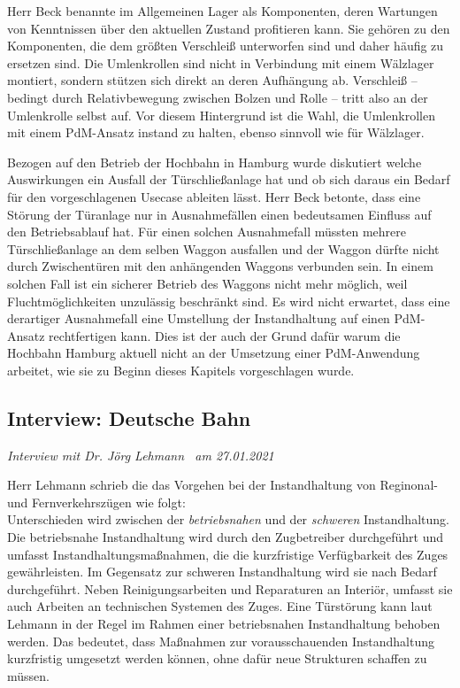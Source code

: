 Herr Beck benannte im Allgemeinen Lager als Komponenten, deren Wartungen von Kenntnissen über den aktuellen Zustand profitieren kann. Sie gehören zu den Komponenten, die dem größten Verschleiß unterworfen sind und daher häufig zu ersetzen sind. Die Umlenkrollen sind nicht in Verbindung mit einem Wälzlager montiert, sondern stützen sich direkt an deren Aufhängung ab. Verschleiß -- bedingt durch Relativbewegung zwischen Bolzen und Rolle -- tritt also an der Umlenkrolle selbst auf. Vor diesem Hintergrund ist die Wahl, die Umlenkrollen mit einem PdM-Ansatz instand zu halten, ebenso sinnvoll wie für Wälzlager.

Bezogen auf den Betrieb der Hochbahn in Hamburg wurde diskutiert welche Auswirkungen ein Ausfall der Türschließanlage hat und ob sich daraus ein Bedarf für den vorgeschlagenen Usecase ableiten lässt. Herr Beck betonte, dass eine Störung der Türanlage nur in Ausnahmefällen einen bedeutsamen Einfluss auf den Betriebsablauf hat. Für einen solchen Ausnahmefall müssten mehrere Türschließanlage an dem selben Waggon ausfallen und der Waggon dürfte nicht durch Zwischentüren mit den anhängenden Waggons verbunden sein. In einem solchen Fall ist ein sicherer Betrieb des Waggons nicht mehr möglich, weil Fluchtmöglichkeiten unzulässig beschränkt sind. Es wird nicht erwartet, dass eine derartiger Ausnahmefall eine Umstellung der Instandhaltung auf einen PdM-Ansatz rechtfertigen kann. Dies ist der auch der Grund dafür warum die Hochbahn Hamburg aktuell nicht an der Umsetzung einer PdM-Anwendung arbeitet, wie sie zu Beginn dieses Kapitels vorgeschlagen wurde.
\subsection{Interview: Deutsche Bahn}
\label{subsec:interview_deutsche_bahn}
\textit{Interview mit Dr. Jörg Lehmann~\cite{db.2021} am {27.01.2021}}

Herr Lehmann schrieb die das Vorgehen bei der Instandhaltung von Reginonal- und Fernverkehrszügen wie folgt:\\
Unterschieden wird zwischen der \textit{betriebsnahen} und der \textit{schweren} Instandhaltung. Die betriebsnahe Instandhaltung wird durch den Zugbetreiber durchgeführt und umfasst Instandhaltungsmaßnahmen, die die kurzfristige Verfügbarkeit des Zuges gewährleisten. Im Gegensatz zur schweren Instandhaltung wird sie nach Bedarf durchgeführt. Neben Reinigungsarbeiten und Reparaturen an Interiör, umfasst sie auch Arbeiten an technischen Systemen des Zuges. Eine Türstörung kann laut Lehmann in der Regel im Rahmen einer betriebsnahen Instandhaltung behoben werden. Das bedeutet, dass Maßnahmen zur vorausschauenden Instandhaltung kurzfristig umgesetzt werden können, ohne dafür neue Strukturen schaffen zu müssen.

